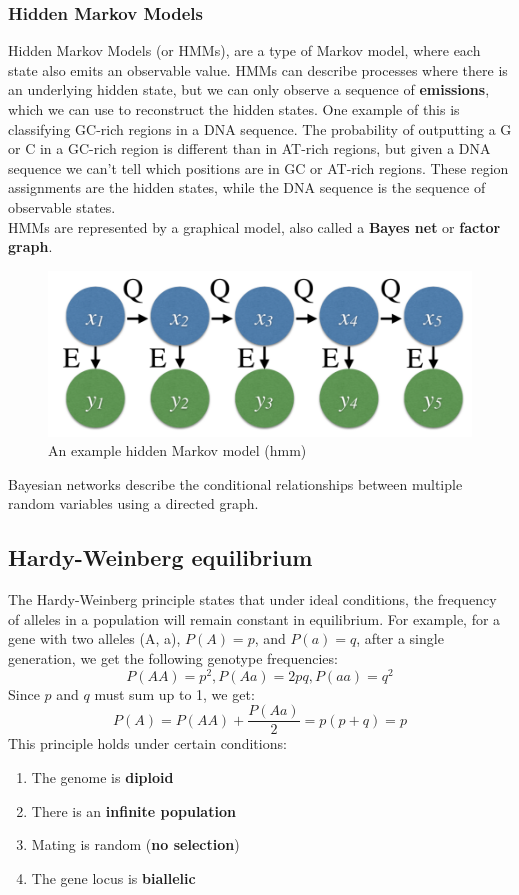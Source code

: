 \documentclass[12pt]{article}
\begin{document}
\subsubsection{Hidden Markov Models}
Hidden Markov Models (or HMMs), are a type of Markov model, where each state also emits an observable value. HMMs can describe processes where there is an underlying hidden state, but we can only observe a sequence of \textbf{emissions}, which we can use to reconstruct the hidden states. One example of this is classifying GC-rich regions in a DNA sequence. The probability of outputting a G or C in a GC-rich region is different than in AT-rich regions, but given a DNA sequence we can't tell which positions are in GC or AT-rich regions. These region assignments are the hidden states, while the DNA sequence is the sequence of observable states.\\[10pt]
HMMs are represented by a graphical model, also called a \textbf{Bayes net} or \textbf{factor graph}.
\begin{figure}
    \centering
    \includegraphics[width = .7\linewidth]{hmm.png}
    \caption{An example hidden Markov model (hmm)}
    \label{fig:hmm}
\end{figure}
Bayesian networks describe the conditional relationships between multiple random variables using a directed graph.

\subsection{Hardy-Weinberg equilibrium}
The Hardy-Weinberg principle states that under ideal conditions, the frequency of alleles in a population will remain constant in equilibrium. For example, for a gene with two alleles (A, a), $P(A) = p$, and $P(a) = q$, after a single generation, we get the following genotype frequencies:
$$P(AA) = p^2, P(Aa) = 2pq, P(aa) = q^2$$
Since $p$ and $q$ must sum up to 1, we get:
$$P(A) = P(AA) + \frac{P(Aa)}{2} = p(p+q) = p$$
This principle holds under certain conditions:
\begin{enumerate}
    \item The genome is \textbf{diploid}
    \item There is an \textbf{infinite population}
    \item Mating is random (\textbf{no selection})
    \item The gene locus is \textbf{biallelic}
\end{enumerate}
\end{document}
